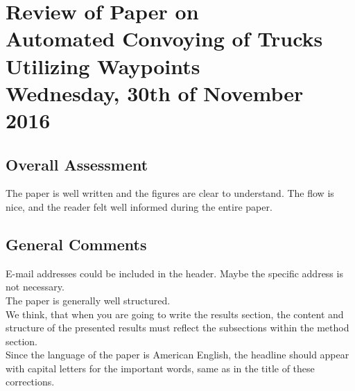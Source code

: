 
\usepackage{enumitem}
\renewcommand{\vec}[1]{\boldsymbol{\mathbf{#1}}}


\renewcommand\chaptername{KAPITEL}
\renewcommand\contentsname{Indhold}
\renewcommand\figurename{Figur}
\renewcommand\tablename{Tabel}

\section*{Review of Paper on\\
Automated Convoying of Trucks Utilizing Waypoints\\
\small Wednesday, 30th of November 2016}
\subsection{Overall Assessment}
The paper is well written and the figures are clear to understand. The flow is nice, and the reader felt well informed during the entire paper.
\vspace{-6pt}
\subsection{General Comments}
E-mail addresses could be included in the header. Maybe the specific address is not necessary.\\

\vspace{-7pt}\noindent
The paper is generally well structured.\\

\vspace{-7pt}\noindent
We think, that when you are going to write the results section, the content and structure of the presented results  must reflect the subsections within the method section. \\

\vspace{-7pt}\noindent
Since the language of the paper is American English, the headline should appear with capital letters for the important words, same as in the title of these corrections.
\vspace{-6pt}
